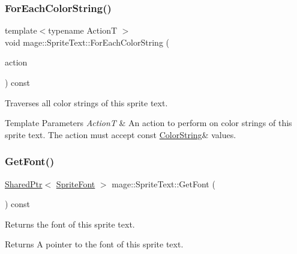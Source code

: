 \subsubsection{\texorpdfstring{For\+Each\+Color\+String()}{ForEachColorString()}\hspace{0.1cm}{\footnotesize\ttfamily [2/2]}}
{\footnotesize\ttfamily template$<$typename ActionT $>$ \\
void mage\+::\+Sprite\+Text\+::\+For\+Each\+Color\+String (\begin{DoxyParamCaption}\item[{ActionT}]{action }\end{DoxyParamCaption}) const\hspace{0.3cm}{\ttfamily [protected]}}

Traverses all color strings of this sprite text.


\begin{DoxyTemplParams}{Template Parameters}
{\em ActionT} & An action to perform on color strings of this sprite text. The action must accept {\ttfamily const} {\ttfamily \hyperlink{structmage_1_1_color_string}{Color\+String}\&} values. \\
\hline
\end{DoxyTemplParams}
\hypertarget{classmage_1_1_sprite_text_a1c80933525f87fe4dced9479c1b79764}{}\label{classmage_1_1_sprite_text_a1c80933525f87fe4dced9479c1b79764} 
\subsubsection{\texorpdfstring{Get\+Font()}{GetFont()}}
{\footnotesize\ttfamily \hyperlink{namespacemage_a1e01ae66713838a7a67d30e44c67703e}{Shared\+Ptr}$<$ \hyperlink{classmage_1_1_sprite_font}{Sprite\+Font} $>$ mage\+::\+Sprite\+Text\+::\+Get\+Font (\begin{DoxyParamCaption}{ }\end{DoxyParamCaption}) const}

Returns the font of this sprite text.

\begin{DoxyReturn}{Returns}
A pointer to the font of this sprite text. 
\end{DoxyReturn}
\hypertarget{classmage_1_1_sprite_text_ab67ba17af1b19766343d04f10853c8d6}{}\label{classmage_1_1_sprite_text_ab67ba17af1b19766343d04f10853c8d6} 
